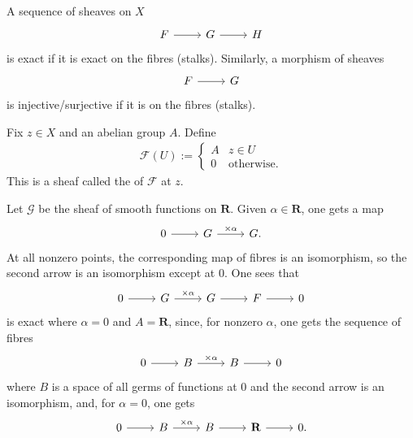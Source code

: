 \documentclass [11 pt, oneside] {article}
\begin{document}
A sequence of sheaves on $X$
\[
\begin{tikzcd}
	\mathscr{F} \ar[r] &\mathscr{G}\ar[r] &\mathscr{H}
\end{tikzcd}
\]
is exact if it is exact on the fibres (stalks). Similarly, a morphism of sheaves 
\[
\begin{tikzcd}
\mathscr{F}\ar[r]& \mathscr{G}
\end{tikzcd}
\]
is injective/surjective if it is on the fibres (stalks).

\begin{example}\label{}\text{}
Fix $z \in X$ and an abelian group $A$. Define
\begin{align*}
	\mathscr{F}(U) := 
	 \begin{cases}
		 A & z\in U\\
		 0&\textrm{otherwise.}
	\end{cases}
\end{align*}
This is a sheaf called the  of $\mathscr{F}$ at $z$. 

Let $\mathscr{G}$ be the sheaf of smooth functions on $\mathbf{R}$. Given $\alpha\in \mathbf{R}$, one gets a map 
\[
\begin{tikzcd}
	0\ar[r] & \mathscr{G}\ar[r, "\times \alpha"] &\mathscr{G}.
\end{tikzcd}
\]
At all nonzero points, the corresponding map of fibres is an isomorphism, so the second arrow is an isomorphism except at $0$. One sees that
\[
\begin{tikzcd}
	0\ar[r] &\mathscr{G}\ar[r,"\times \alpha"] &\mathscr{G}\ar[r] &\mathscr{F}\ar[r] &0
\end{tikzcd}
\]
is exact where $\alpha = 0$ and $A=\mathbf{R}$, since, for nonzero $\alpha$, one gets the sequence of fibres
\[
\begin{tikzcd}
	0 \ar[r] & B\ar[r, "\times \alpha"] & B\ar[r] &0
\end{tikzcd}
\]
where $B$ is a space of all germs of functions at $0$ and the second arrow is an isomorphism, and, for $\alpha = 0$, one gets
\[
\begin{tikzcd}
	0\ar[r] & B\ar[r,"\times\alpha"] & B\ar[r] & \mathbf{R}\ar[r] & 0.
\end{tikzcd}
\]
\end{example}
\end{document}
